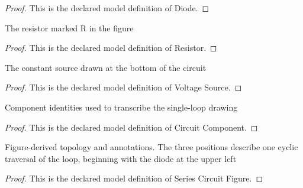 \begin{proof}
  This is the declared model definition of Diode.
\end{proof}
\begin{definition}[Resistor]
  \label{def:physics:phyx-mini-0572:phyxminiproblems-problemphyxmini0572-resistor}
  The resistor marked R in the figure
\end{definition}
\begin{proof}
  This is the declared model definition of Resistor.
\end{proof}
\begin{definition}
  \label{def:physics:phyx-mini-0572:phyxminiproblems-problemphyxmini0572-voltagesource}
  The constant source drawn at the bottom of the circuit
\end{definition}
\begin{proof}
  This is the declared model definition of Voltage Source.
\end{proof}
\begin{definition}
  \label{def:physics:phyx-mini-0572:phyxminiproblems-problemphyxmini0572-circuitcomponent}
  Component identities used to transcribe the single-loop drawing
\end{definition}
\begin{proof}
  This is the declared model definition of Circuit Component.
\end{proof}
\begin{definition}
  \label{def:physics:phyx-mini-0572:phyxminiproblems-problemphyxmini0572-seriescircuitfigure}
  Figure-derived topology and annotations. The three positions describe one cyclic traversal of the loop, beginning with the diode at the upper left
\end{definition}
\begin{proof}
  This is the declared model definition of Series Circuit Figure.
\end{proof}
